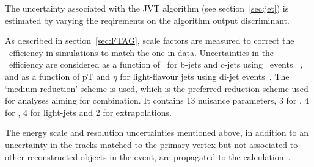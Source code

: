 The uncertainty associated with the JVT algorithm (see section~\ref{sec:jet}) 
is estimated by varying the reqirements on the algorithm output discriminant. 


As described in section~\ref{sec:FTAG}, scale factors are measured 
to correct the \btagging\ efficiency in simulations to match the one in data. 
Uncertainties in the \btagging\ efficiency are considered
as a function of \pt\ for b-jets and c-jets using \ttbar\ events~
\cite{FTAG-2018-01,FTAG-paper}, 
and as a function of pT and $\eta$ for
light-flavour jets using di-jet events~\cite{ATLAS-CONF-2018-006}.
The `medium reduction' scheme is used, which is
the preferred reduction scheme used for analyses aiming for combination. 
It contains 13 nuisance parameters, 3 for \bjets, 4 for \cjets, 
4 for light-jets and 2 for extrapolations.


The energy scale and resolution uncertainties mentioned above, 
in addition to an uncertainty in the tracks matched to the primary vertex 
but not associated to other reconstructed objects in the event, are
propagated to the \met calculation~\cite{PERF-2016-07}.




